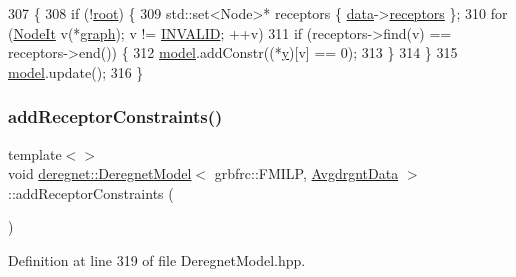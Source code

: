\begin{DoxyCode}
307                                                         \{
308     \textcolor{keywordflow}{if} (!\hyperlink{classderegnet_1_1DeregnetModel_a54b20393a0e26d65935d387685d7fe96}{root}) \{
309         std::set<Node>* receptors \{ \hyperlink{classderegnet_1_1DeregnetModel_ad5399761cf6293a702f3800bda4806d1}{data}->\hyperlink{classderegnet_1_1DeregnetData_a470cc9f84741c59897ab1e7a3daa1205}{receptors} \};
310         \textcolor{keywordflow}{for} (\hyperlink{namespacederegnet_ac34314e1b5f456fc6d1bb9d96316de4a}{NodeIt} v(*\hyperlink{classderegnet_1_1DeregnetModel_a3cd2f54b8e061ef5bed32708d9bc1ef1}{graph}); v != \hyperlink{usinglemon_8hpp_adf770fe2eec438e3758ffe905dbae208}{INVALID}; ++v)
311             \textcolor{keywordflow}{if} (receptors->find(v) == receptors->end()) \{
312                 \hyperlink{classderegnet_1_1DeregnetModel_a30d525de2086e342b33fe3e45ede4947}{model}.addConstr((*\hyperlink{classderegnet_1_1DeregnetModel_ae76df61afe302b939165facf3dd21ac8}{y})[v] == 0);
313             \}
314     \}
315     \hyperlink{classderegnet_1_1DeregnetModel_a30d525de2086e342b33fe3e45ede4947}{model}.update();
316 \}
\end{DoxyCode}
\mbox{\label{classderegnet_1_1DeregnetModel_ae83f5316463b9296089fa4c2a2f81635}} 
\subsubsection{\texorpdfstring{add\+Receptor\+Constraints()}{addReceptorConstraints()}\hspace{0.1cm}{\footnotesize\ttfamily [2/2]}}
{\footnotesize\ttfamily template$<$$>$ \\
void \hyperlink{classderegnet_1_1DeregnetModel}{deregnet\+::\+Deregnet\+Model}$<$ grbfrc\+::\+F\+M\+I\+LP, \hyperlink{classderegnet_1_1AvgdrgntData}{Avgdrgnt\+Data} $>$\+::add\+Receptor\+Constraints (\begin{DoxyParamCaption}{ }\end{DoxyParamCaption})\hspace{0.3cm}{\ttfamily [inline]}}



Definition at line 319 of file Deregnet\+Model.\+hpp.


